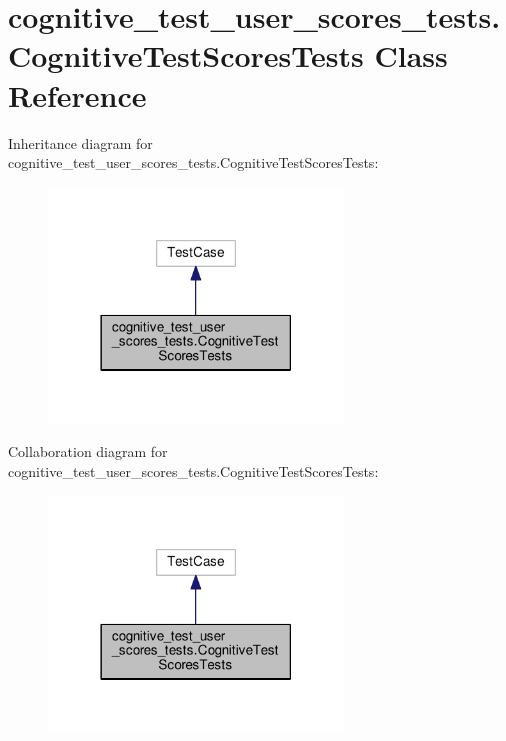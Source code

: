 \hypertarget{classcognitive__test__user__scores__tests_1_1CognitiveTestScoresTests}{\section{cognitive\-\_\-test\-\_\-user\-\_\-scores\-\_\-tests.\-Cognitive\-Test\-Scores\-Tests Class Reference}
\label{classcognitive__test__user__scores__tests_1_1CognitiveTestScoresTests}
}


Inheritance diagram for cognitive\-\_\-test\-\_\-user\-\_\-scores\-\_\-tests.\-Cognitive\-Test\-Scores\-Tests\-:
\nopagebreak
\begin{figure}[H]
\begin{center}
\leavevmode
\includegraphics[width=222pt]{classcognitive__test__user__scores__tests_1_1CognitiveTestScoresTests__inherit__graph}
\end{center}
\end{figure}


Collaboration diagram for cognitive\-\_\-test\-\_\-user\-\_\-scores\-\_\-tests.\-Cognitive\-Test\-Scores\-Tests\-:
\nopagebreak
\begin{figure}[H]
\begin{center}
\leavevmode
\includegraphics[width=222pt]{classcognitive__test__user__scores__tests_1_1CognitiveTestScoresTests__coll__graph}
\end{center}
\end{figure}
